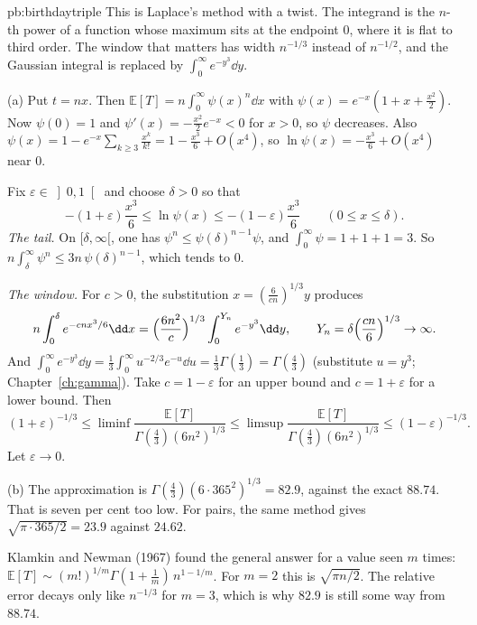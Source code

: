 \begin{solution}{pb:birthdaytriple}
\idea This is Laplace's method with a twist. The integrand is the $n$-th power of a function whose maximum sits at the endpoint $0$, where it is flat to third order. The window that matters has width $n^{-1/3}$ instead of $n^{-1/2}$, and the Gaussian integral is replaced by $\int_0^\infty e^{-y^3}\dd y$.

\writeup (a) Put $t=nx$. Then $\mathbb E[T]=n\int_0^\infty\psi(x)^n\dd x$ with $\psi(x)=e^{-x}(1+x+\frac{x^2}2)$. Now $\psi(0)=1$ and $\psi'(x)=-\frac{x^2}2e^{-x}<0$ for $x>0$, so $\psi$ decreases. Also $\psi(x)=1-e^{-x}\sum_{k\ge3}\frac{x^k}{k!}=1-\frac{x^3}6+O(x^4)$, so $\ln\psi(x)=-\frac{x^3}6+O(x^4)$ near $0$.

Fix $\varepsilon\in\left]0,1\right[$ and choose $\delta>0$ so that
\[
-(1+\varepsilon)\frac{x^3}6\le\ln\psi(x)\le-(1-\varepsilon)\frac{x^3}6\qquad(0\le x\le\delta).
\]
\emph{The tail.} On $[\delta,\infty[$, one has $\psi^n\le\psi(\delta)^{n-1}\psi$, and $\int_0^\infty\psi=1+1+1=3$. So $n\int_\delta^\infty\psi^n\le3n\,\psi(\delta)^{n-1}$, which tends to $0$.

\emph{The window.} For $c>0$, the substitution $x=(\frac6{cn})^{1/3}y$ produces
\[
n\int_0^\delta e^{-cnx^3/6}\dd x=\Bigl(\frac{6n^2}c\Bigr)^{1/3}\int_0^{Y_n}e^{-y^3}\dd y,\qquad Y_n=\delta\Bigl(\frac{cn}6\Bigr)^{1/3}\to\infty.
\]
And $\int_0^\infty e^{-y^3}\dd y=\frac13\int_0^\infty u^{-2/3}e^{-u}\dd u=\frac13\Gamma(\frac13)=\Gamma(\frac43)$ (substitute $u=y^3$; Chapter~\ref{ch:gamma}). Take $c=1-\varepsilon$ for an upper bound and $c=1+\varepsilon$ for a lower bound. Then
\[
(1+\varepsilon)^{-1/3}\le\liminf\frac{\mathbb E[T]}{\Gamma(\frac43)(6n^2)^{1/3}}\le\limsup\frac{\mathbb E[T]}{\Gamma(\frac43)(6n^2)^{1/3}}\le(1-\varepsilon)^{-1/3}.
\]
Let $\varepsilon\to0$.

(b) The approximation is $\Gamma(\frac43)(6\cdot365^2)^{1/3}=82.9$, against the exact $88.74$. That is seven per cent too low. For pairs, the same method gives $\sqrt{\pi\cdot365/2}=23.9$ against $24.62$.

\leads Klamkin and Newman (1967) found the general answer for a value seen $m$ times: $\mathbb E[T]\sim(m!)^{1/m}\Gamma(1+\frac1m)\,n^{1-1/m}$. For $m=2$ this is $\sqrt{\pi n/2}$. The relative error decays only like $n^{-1/3}$ for $m=3$, which is why $82.9$ is still some way from $88.74$.
\end{solution}

